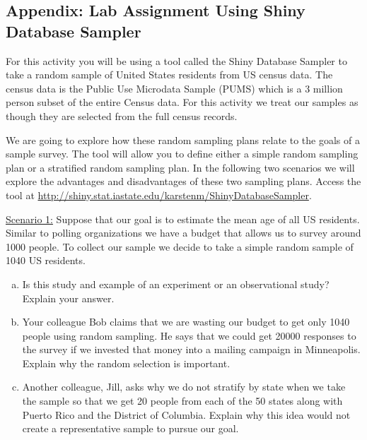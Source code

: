 \documentclass[11pt]{isuthesis}\usepackage[]{graphicx}\usepackage[]{color}
\newenvironment{knitrout}{}{} %
\begin{document}
\begin{appendices}
\begin{knitrout}
\end{knitrout}




\chapter{ }

\section{Appendix: Lab Assignment Using Shiny Database Sampler}
\label{labappend}

For this activity you will be using a tool called the Shiny Database Sampler to take a random sample of United States residents from US census data. The census data is the Public Use Microdata Sample (PUMS) which is a 3 million person subset of the entire Census data.  For this activity we treat our samples as though they are selected from the full census records.  
  
We are going to explore how these random sampling plans relate to the goals of a sample survey. The tool will allow you to define either a simple random sampling plan or a stratified random sampling plan. In the following two scenarios we will explore the advantages and disadvantages of these two sampling plans. Access the tool at \url{http://shiny.stat.iastate.edu/karstenm/ShinyDatabaseSampler}. 

\underline{Scenario 1:} Suppose that our goal is to estimate the mean age of all US residents. Similar to polling organizations we have a budget that allows us to survey around 1000 people. To collect our sample we decide to take a simple random sample of 1040 US residents. \\

\begin{enumerate}[(a)]
\item Is this study and example of an experiment or an observational study?  Explain your answer.
\item	Your colleague Bob claims that we are wasting our budget to get only 1040 people using random sampling. He says that we could get 20000 responses to the survey if we invested that money into a mailing campaign in Minneapolis. Explain why the random selection is important.
\item	Another colleague, Jill, asks why we do not stratify by state when we take the sample so that we get 20 people from each of the 50 states along with Puerto Rico and the District of Columbia. Explain why this idea would not create a representative sample to pursue our goal.
\end{enumerate}


\end{appendices}
\end{document}
